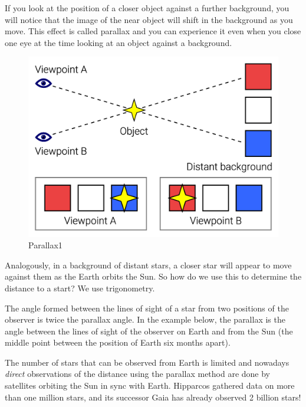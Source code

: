 \documentclass[
  letterpaper,
  DIV=11,
  numbers=noendperiod]{scrreprt}
\begin{document}
If you look at the position of a closer object against a further
background, you will notice that the image of the near object will shift
in the background as you move. This effect is called parallax and you
can experience it even when you close one eye at the time looking at an
object against a background.

\begin{figure}

{\centering \includegraphics{img/Parallax_Example.png}

}

\caption{Parallax1}

\end{figure}

Analogously, in a background of distant stars, a closer star will appear
to move against them as the Earth orbits the Sun. So how do we use this
to determine the distance to a start? We use trigonometry.

The angle formed between the lines of sight of a star from two positions
of the observer is twice the parallax angle. In the example below, the
parallax is the angle between the lines of sight of the observer on
Earth and from the Sun (the middle point between the position of Earth
six months apart).

The number of stars that can be observed from Earth is limited and
nowadays \emph{direct} observations of the distance using the parallax
method are done by satellites orbiting the Sun in sync with Earth.
Hipparcos gathered data on more than one million stars, and its
successor Gaia has already observed 2 billion stars!
\end{document}
